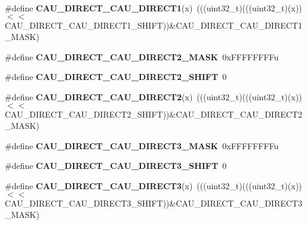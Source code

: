 \begin{DoxyCompactItemize}
\item 
\#define {\bfseries C\+A\+U\+\_\+\+D\+I\+R\+E\+C\+T\+\_\+\+C\+A\+U\+\_\+\+D\+I\+R\+E\+C\+T1}(x)~(((uint32\+\_\+t)(((uint32\+\_\+t)(x))$<$$<$C\+A\+U\+\_\+\+D\+I\+R\+E\+C\+T\+\_\+\+C\+A\+U\+\_\+\+D\+I\+R\+E\+C\+T1\+\_\+\+S\+H\+I\+FT))\&C\+A\+U\+\_\+\+D\+I\+R\+E\+C\+T\+\_\+\+C\+A\+U\+\_\+\+D\+I\+R\+E\+C\+T1\+\_\+\+M\+A\+SK)\hypertarget{group__CAU__Register__Masks_ga187f19ca2f30c2ec338747f4a83f97a4}{}\label{group__CAU__Register__Masks_ga187f19ca2f30c2ec338747f4a83f97a4}

\item 
\#define {\bfseries C\+A\+U\+\_\+\+D\+I\+R\+E\+C\+T\+\_\+\+C\+A\+U\+\_\+\+D\+I\+R\+E\+C\+T2\+\_\+\+M\+A\+SK}~0x\+F\+F\+F\+F\+F\+F\+F\+Fu\hypertarget{group__CAU__Register__Masks_ga1a2d18db12abd15f6bab404f4f36ed50}{}\label{group__CAU__Register__Masks_ga1a2d18db12abd15f6bab404f4f36ed50}

\item 
\#define {\bfseries C\+A\+U\+\_\+\+D\+I\+R\+E\+C\+T\+\_\+\+C\+A\+U\+\_\+\+D\+I\+R\+E\+C\+T2\+\_\+\+S\+H\+I\+FT}~0\hypertarget{group__CAU__Register__Masks_ga84f35cfb3852d2a827fa1ad80bfb207f}{}\label{group__CAU__Register__Masks_ga84f35cfb3852d2a827fa1ad80bfb207f}

\item 
\#define {\bfseries C\+A\+U\+\_\+\+D\+I\+R\+E\+C\+T\+\_\+\+C\+A\+U\+\_\+\+D\+I\+R\+E\+C\+T2}(x)~(((uint32\+\_\+t)(((uint32\+\_\+t)(x))$<$$<$C\+A\+U\+\_\+\+D\+I\+R\+E\+C\+T\+\_\+\+C\+A\+U\+\_\+\+D\+I\+R\+E\+C\+T2\+\_\+\+S\+H\+I\+FT))\&C\+A\+U\+\_\+\+D\+I\+R\+E\+C\+T\+\_\+\+C\+A\+U\+\_\+\+D\+I\+R\+E\+C\+T2\+\_\+\+M\+A\+SK)\hypertarget{group__CAU__Register__Masks_gaa84f31257ab678ef4963956c651a5d0d}{}\label{group__CAU__Register__Masks_gaa84f31257ab678ef4963956c651a5d0d}

\item 
\#define {\bfseries C\+A\+U\+\_\+\+D\+I\+R\+E\+C\+T\+\_\+\+C\+A\+U\+\_\+\+D\+I\+R\+E\+C\+T3\+\_\+\+M\+A\+SK}~0x\+F\+F\+F\+F\+F\+F\+F\+Fu\hypertarget{group__CAU__Register__Masks_ga510182cd7a5c184e092fae143ab6b4cd}{}\label{group__CAU__Register__Masks_ga510182cd7a5c184e092fae143ab6b4cd}

\item 
\#define {\bfseries C\+A\+U\+\_\+\+D\+I\+R\+E\+C\+T\+\_\+\+C\+A\+U\+\_\+\+D\+I\+R\+E\+C\+T3\+\_\+\+S\+H\+I\+FT}~0\hypertarget{group__CAU__Register__Masks_ga0a9ed1b0b2d909b4c11c6591d4c8425c}{}\label{group__CAU__Register__Masks_ga0a9ed1b0b2d909b4c11c6591d4c8425c}

\item 
\#define {\bfseries C\+A\+U\+\_\+\+D\+I\+R\+E\+C\+T\+\_\+\+C\+A\+U\+\_\+\+D\+I\+R\+E\+C\+T3}(x)~(((uint32\+\_\+t)(((uint32\+\_\+t)(x))$<$$<$C\+A\+U\+\_\+\+D\+I\+R\+E\+C\+T\+\_\+\+C\+A\+U\+\_\+\+D\+I\+R\+E\+C\+T3\+\_\+\+S\+H\+I\+FT))\&C\+A\+U\+\_\+\+D\+I\+R\+E\+C\+T\+\_\+\+C\+A\+U\+\_\+\+D\+I\+R\+E\+C\+T3\+\_\+\+M\+A\+SK)\hypertarget{group__CAU__Register__Masks_gabcf7cce02f44a12d83b0b796ce992859}{}\label{group__CAU__Register__Masks_gabcf7cce02f44a12d83b0b796ce992859}


\end{DoxyCompactItemize}
